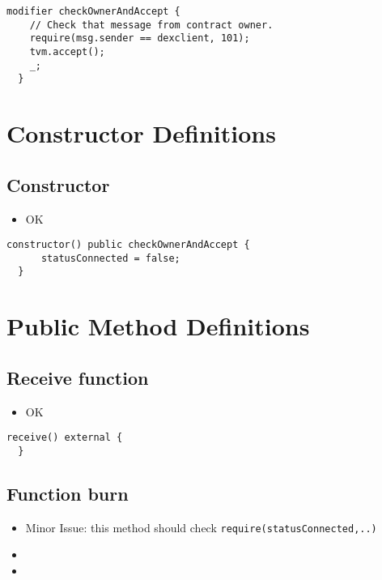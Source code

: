 \begin{lstlisting}[firstnumber=32]
  modifier checkOwnerAndAccept {
    // Check that message from contract owner.
    require(msg.sender == dexclient, 101);
    tvm.accept();
    _;
  }
\end{lstlisting}

\section{Constructor Definitions}

\subsection{Constructor}

\begin{itemize}
\item OK
\end{itemize}

\begin{lstlisting}[firstnumber=39]
  constructor() public checkOwnerAndAccept {
      statusConnected = false;
  }
\end{lstlisting}

\section{Public Method Definitions}

\subsection{Receive function}

\begin{itemize}
\item OK
\end{itemize}

\begin{lstlisting}[firstnumber=129]
  receive() external {
  }
\end{lstlisting}

\subsection{Function burn}

\begin{itemize}
\item Minor Issue: this method should check {\tt require(statusConnected,..)}
\item \issueError{}
\item \issueEncodeBody{}
\end{itemize}

